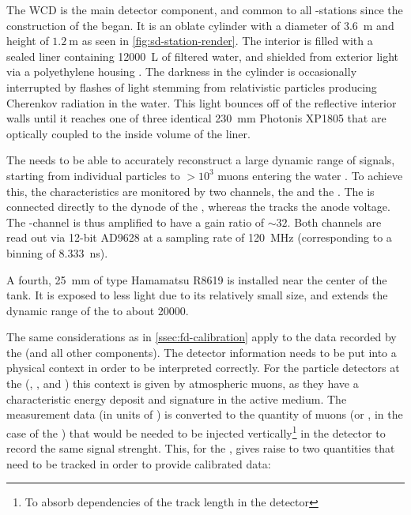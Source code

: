 The \acf{WCD} is the main detector component, and common to all \SD-stations 
since the construction of the \PAO began. It is an oblate cylinder with a 
diameter of \SI{3.6}{\meter} and height of $\SI{1.2}{\meter}$ as seen in 
\cref{fig:sd-station-render}. The interior is filled with a sealed liner 
containing \SI{12000}{\liter} of filtered water, and shielded from exterior 
light via a polyethylene housing \cite{allekotteSurfaceDetectorSystem2008}. The
darkness in the cylinder is occasionally interrupted by flashes of light 
stemming from relativistic particles producing Cherenkov radiation in the 
water. This light bounces off of the reflective interior walls until it reaches
one of three identical \SI{230}{\milli\meter} Photonis XP1805 \LPMTs 
\cite{tripathiSystematicStudyLarge2003} that are optically coupled to the 
inside volume of the liner.

The \WCD needs to be able to accurately reconstruct a large dynamic range of
signals, starting from individual particles to $>10^3$ muons entering the water
\cite{abrahamTriggerApertureSurface2010}. To achieve this, the \LPMTs 
characteristics are monitored by two channels, the \HG and the \LG. The \LG 
is connected directly to the dynode of the \PMTs, whereas the \HG tracks the 
anode voltage. The \HG-channel is thus amplified to have a gain ratio of 
$\sim32$. Both channels are read out via 12-bit AD9628 \FADCs 
\cite{analogdevicesinc.AD9628DatasheetProduct2015} at a sampling rate of \SI{120}{\mega\hertz} (corresponding to a binning of \SI{8.333}{\nano\second}). 

A fourth, \SI{25}{\milli\meter} \SPMT of type Hamamatsu R8619 
\cite{hamamatsuphotonicsPhotomultiplierTubeR8619} is installed near the center
of the tank. It is exposed to less light due to its relatively small size, and 
extends the dynamic range of the \WCD to about \SI{20000}{\VEM}.

The same considerations as in \cref{ssec:fd-calibration} apply to the data
recorded by the \WCD (and all other \SD components). The detector information 
needs to be put into a physical context in order to be interpreted correctly.
For the particle detectors at the \PAO (\WCD, \SSD, and \UMD) this context is 
given by atmospheric muons, as they have a characteristic energy deposit and 
signature in the active medium. The measurement data (in units of \ADC) is
converted to the quantity of muons (or \MIPs, in the case of the \SSD) that
would be needed to be injected vertically\footnote{To absorb dependencies of 
the track length in the detector} in the detector to record the same signal 
strenght. This, for the \WCD, gives raise to two quantities that need to be 
tracked in order to provide calibrated data:

